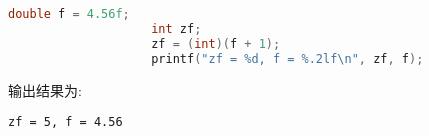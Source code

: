             \begin{Example}[显示转换]
                \begin{lstlisting}[language = {C}, gobble = 20]
                    double f = 4.56f;
                    int zf;
                    zf = (int)(f + 1);
                    printf("zf = %d, f = %.2lf\n", zf, f);
                \end{lstlisting}

                输出结果为: 
                \begin{lstlisting}[gobble = 20]
                    zf = 5, f = 4.56
                \end{lstlisting}
            \end{Example}
